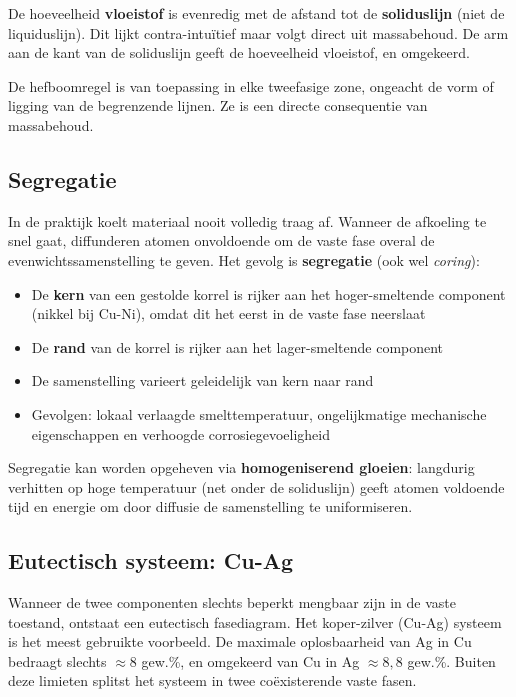 \begin{warningbox}
De hoeveelheid \textbf{vloeistof} is evenredig met de afstand tot de \textbf{soliduslijn} (niet de liquiduslijn). Dit lijkt contra-intuïtief maar volgt direct uit massabehoud. De arm aan de kant van de soliduslijn geeft de hoeveelheid vloeistof, en omgekeerd.
\end{warningbox}

De hefboomregel is van toepassing in elke tweefasige zone, ongeacht de vorm of ligging van de begrenzende lijnen. Ze is een directe consequentie van massabehoud.

\subsection{Segregatie}

In de praktijk koelt materiaal nooit volledig traag af. Wanneer de afkoeling te snel gaat, diffunderen atomen onvoldoende om de vaste fase overal de evenwichtssamenstelling te geven. Het gevolg is \textbf{segregatie} (ook wel \emph{coring}):
\begin{itemize}
    \item De \textbf{kern} van een gestolde korrel is rijker aan het hoger-smeltende component (nikkel bij Cu-Ni), omdat dit het eerst in de vaste fase neerslaat
    \item De \textbf{rand} van de korrel is rijker aan het lager-smeltende component
    \item De samenstelling varieert geleidelijk van kern naar rand
    \item Gevolgen: lokaal verlaagde smelttemperatuur, ongelijkmatige mechanische eigenschappen en verhoogde corrosiegevoeligheid
\end{itemize}

Segregatie kan worden opgeheven via \textbf{homogeniserend gloeien}: langdurig verhitten op hoge temperatuur (net onder de soliduslijn) geeft atomen voldoende tijd en energie om door diffusie de samenstelling te uniformiseren.

\subsection{Eutectisch systeem: Cu-Ag}

Wanneer de twee componenten slechts beperkt mengbaar zijn in de vaste toestand, ontstaat een eutectisch fasediagram. Het koper-zilver (Cu-Ag) systeem is het meest gebruikte voorbeeld. De maximale oplosbaarheid van Ag in Cu bedraagt slechts $\approx 8$ gew.\%, en omgekeerd van Cu in Ag $\approx 8{,}8$ gew.\%. Buiten deze limieten splitst het systeem in twee coëxisterende vaste fasen.

